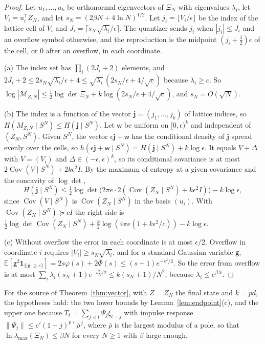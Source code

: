 \documentclass[11pt,onecolumn]{IEEEtran}
\newcommand{\E}{\mathbb{E}}
\newcommand{\Cov}{\operatorname{Cov}}
\begin{document}
\begin{proof}
Let $u_1,\dots,u_k$ be orthonormal eigenvectors of $\Xi_N$ with
eigenvalues $\lambda_i$, let $V_i=u_i^{\mathsf T}Z_N$, and let
$s_N=(2\beta N+4\ln N)^{1/2}$. Let $j_i=\lfloor V_i/\epsilon\rfloor$ be
the index of the lattice cell of $V_i$ and $J_i=\lceil s_N\sqrt{\lambda_i}/\epsilon\rceil$.
The quantizer sends $j_i$ when $|j_i|\le J_i$ and an overflow symbol
otherwise, and the reproduction is the midpoint $(j_i+\tfrac12)\epsilon$
of the cell, or $0$ after an overflow, in each coordinate.

(a) The index set has $\prod_i(2J_i+2)$ elements, and
$2J_i+2\le2s_N\sqrt{\lambda_i}/\epsilon+4\le\sqrt{\lambda_i}\,(2s_N/\epsilon+4/\sqrt c)$
because $\lambda_i\ge c$. So
$\log|\mathcal M_{Z,N}|\le\tfrac12\log\det\Xi_N+k\log(2s_N/\epsilon+4/\sqrt c)$,
and $s_N=O(\sqrt N)$.

(b) The index is a function of the vector $\mathbf j=(j_1,\dots,j_k)$ of
lattice indices, so $H(M_{Z,N}\mid S^N)\le H(\mathbf j\mid S^N)$. Let
$\mathsf w$ be uniform on $[0,\epsilon)^k$ and independent of
$(Z_N,S^N)$. Given $S^N$, the vector $\epsilon\mathbf j+\mathsf w$ has the
conditional density of $\mathbf j$ spread evenly over the cells, so
$h(\epsilon\mathbf j+\mathsf w\mid S^N)=H(\mathbf j\mid S^N)+k\log\epsilon$.
It equals $V+\Delta$ with $V=(V_i)$ and $\Delta\in(-\epsilon,\epsilon)^k$,
so its conditional covariance is at most $2\Cov(V\mid S^N)+2k\epsilon^2I$.
By the maximum of entropy at a given covariance and the concavity of
$\log\det$,
\begin{equation}
H(\mathbf j\mid S^N)\le\tfrac12\log\det\bigl(2\pi e\cdot2(\Cov(Z_N\mid S^N)+k\epsilon^2I)\bigr)-k\log\epsilon,
\label{eq:quant}
\end{equation}
since $\Cov(V\mid S^N)$ is $\Cov(Z_N\mid S^N)$ in the basis $(u_i)$. With
$\Cov(Z_N\mid S^N)\succeq cI$ the right side is
$\tfrac12\log\det\Cov(Z_N\mid S^N)+\tfrac k2\log(4\pi e(1+k\epsilon^2/c))-k\log\epsilon$.

(c) Without overflow the error in each coordinate is at most
$\epsilon/2$. Overflow in coordinate $i$ requires
$|V_i|\ge s_N\sqrt{\lambda_i}$, and for a standard Gaussian variable
$\mathsf g$,
$\E[\mathsf g^2\mathbf 1_{\{|\mathsf g|\ge s\}}]=2s\varphi(s)+2\bar\Phi(s)\le(s+1)e^{-s^2/2}$.
So the error from overflow is at most
$\sum_i\lambda_i(s_N+1)e^{-s_N^2/2}\le k(s_N+1)/N^2$, because
$\lambda_i\le e^{\beta N}$.
\end{proof}

For the source of Theorem~\ref{thm:vector}, with $Z=Z_N$ the final state
and $k=pd$, the hypotheses hold: the two lower bounds by
Lemma~\ref{lem:endpoint}(c), and the upper one because
$T_t=\sum_{j<t}\Psi_j\xi_{t-j}$ with impulse response
$\|\Psi_j\|\le c'(1+j)^{p\varsigma}\bar\rho^{\,j}$, where $\bar\rho$ is the
largest modulus of a pole, so that $\ln\lambda_{\max}(\Xi_N)\le\beta N$ for
every $N\ge1$ with $\beta$ large enough.
\end{document}
